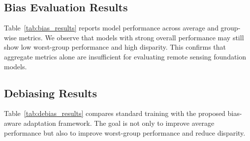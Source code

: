 \documentclass[10pt,twocolumn,letterpaper]{article}
\newcommand{\method}{\textsc{FairRSFM}\xspace}
\begin{document}
\subsection{Bias Evaluation Results}

Table~\ref{tab:bias_results} reports model performance across average and group-wise metrics. We observe that models with strong overall performance may still show low worst-group performance and high disparity. This confirms that aggregate metrics alone are insufficient for evaluating remote sensing foundation models.

\begin{table}[t]
\centering
\caption{Bias evaluation of representative foundation models on \method. Replace TODO values with experimental results. Higher is better for Acc., F1, and worst-group performance; lower is better for disparity.}
\label{tab:bias_results}
\end{table}

\subsection{Debiasing Results}

Table~\ref{tab:debias_results} compares standard training with the proposed bias-aware adaptation framework. The goal is not only to improve average performance but also to improve worst-group performance and reduce disparity.
\end{document}
